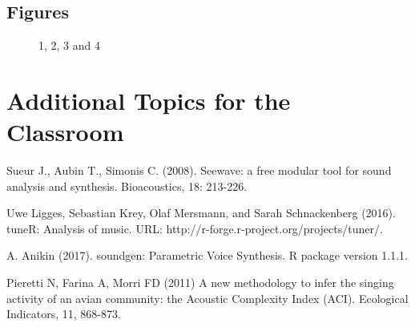 \subsection{Figures}

\begin{figure}[H]
	\centering
	\begin{minipage}[b]{0.5\linewidth}
	\end{minipage}\hfill
	\begin{minipage}[b]{0.5\linewidth}
	\end{minipage}\hfill	
	\begin{minipage}[b]{0.5\linewidth}
	\end{minipage}\hfill
	\begin{minipage}[b]{0.5\linewidth}
	\end{minipage}\hfill
	\caption{1, 2, 3 and 4}
	\label{fig:Figure1}
\end{figure} 


\section{Additional Topics for the Classroom}

\begin{enumerate}
\end{enumerate}


\begin{thebibliography}{00}
Sueur J., Aubin T., Simonis C. (2008). 
\newblock Seewave: a free modular tool for sound analysis and synthesis. 
\newblock Bioacoustics, 18: 213-226.

Uwe Ligges, Sebastian Krey, Olaf Mersmann, and Sarah Schnackenberg (2016). 
\newblock tuneR: Analysis of music. 
\newblock URL: http://r-forge.r-project.org/projects/tuner/.

A. Anikin (2017). 
\newblock soundgen: Parametric Voice Synthesis. 
\newblock R package version 1.1.1.

Pieretti N, Farina A, Morri FD (2011) 
\newblock A new methodology to infer the singing activity of an avian community: the Acoustic Complexity Index (ACI). 
\newblock Ecological Indicators, 11, 868-873.
\end{thebibliography}


